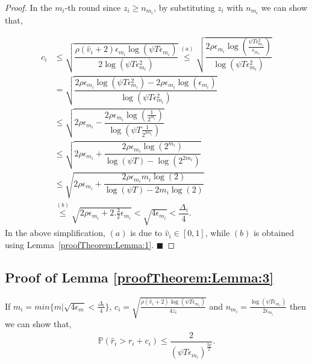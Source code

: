 \begin{proof}

	In the $m_i$-th round since $z_i\geq n_{m_i}$, by substituting $z_i$ with $n_{m_i}$ we can show that, 

\begin{align*}
	c_{i} &\leq \sqrt{\dfrac{\rho (\hat{v}_i + 2)\epsilon_{m_{i}}\log (\psi T\epsilon_{m_{i}})}{2\log(\psi T\epsilon_{m_{i}}^{2})}} \overset{(a)}{\leq} \sqrt{\dfrac{2\rho\epsilon_{m_{i}}\log (\frac{\psi T\epsilon_{m_{i}}^{2}}{\epsilon_{m_{i}}})}{\log(\psi T\epsilon_{m_{i}}^{2})}} \\
	& = \sqrt{\dfrac{2\rho\epsilon_{m_{i}}\log (\psi T\epsilon_{m_{i}}^{2}) - 2\rho\epsilon_{m_{i}}\log (\epsilon_{m_{i}})}{\log(\psi T\epsilon_{m_{i}}^{2})}} \\
	& \leq  \sqrt{2\rho\epsilon_{m_{i}} - \dfrac{2\rho\epsilon_{m_i}\log(\frac{1}{2^{m_i}})}{\log(\psi T \frac{1}{2^{2m_i}})}} \\
	&\leq \sqrt{2\rho\epsilon_{m_{i}} + \dfrac{2\rho\epsilon_{m_i}\log(2^{m_i})}{\log(\psi T) - \log( 2^{2m_i})}}\\
	& \leq \sqrt{2\rho\epsilon_{m_{i}} + \dfrac{2\rho\epsilon_{m_i}m_i \log(2)}{\log(\psi T) - 2m_i\log( 2)}} \\ 
	 & \overset{(b)}{\leq} \sqrt{2\rho\epsilon_{m_{i}} + 2.\frac{3}{2}\epsilon_{m_i}} 
	  < \sqrt{4\epsilon_{m_i}} < \dfrac{\Delta_{i}}{4}.
	\end{align*}
In the above simplification, $(a)$ is due to $\hat{v}_i \in [0,1]$, while $(b)$ is obtained using Lemma~\ref{proofTheorem:Lemma:1}.
\hfill $\blacksquare$	
\end{proof}


\subsection{Proof of Lemma \ref{proofTheorem:Lemma:3}}
\label{App:Lemma:3}

\begin{customlem}{3}
If $m_i = min\lbrace m|\sqrt{4\epsilon_{m} } < \frac{\Delta_i}{4} \rbrace $,  $c_{i} = \sqrt{\frac{\rho (\hat{v}_i + 2) \log (\psi T\epsilon_{m_{i}})}{4 z_{i}}}$ and $n_{m_i} = \frac{\log{(\psi T\epsilon_{m_{i}})}}{2\epsilon_{m_{i}}}$ then we can show that,
\begin{align*}
\mathbb{P}(\hat{r}_{i}> r_{i} + c_{i})\le \dfrac{2}{(\psi  T\epsilon_{m_{i}})^{\frac{3\rho}{2}}}.
\end{align*}
\end{customlem}


